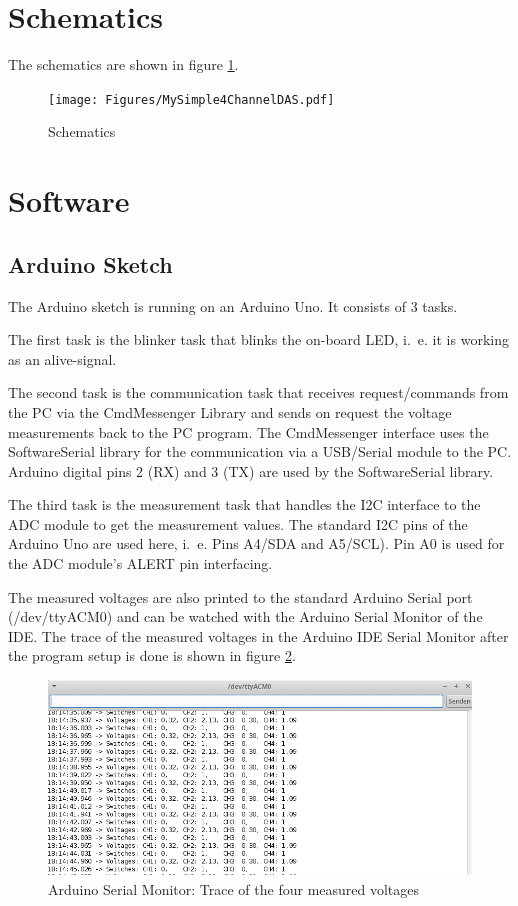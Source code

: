 \documentclass[11pt, oneside]{scrartcl}   	%
\begin{document}
\newpage
\section{Schematics}
The schematics are shown in figure \ref{fig:Schematics}.
\begin{figure}[htbp]
	\centering
	\texttt{[image: Figures/MySimple4ChannelDAS.pdf]}
	\caption[Schematics]{Schematics}
	\label{fig:Schematics}
\end{figure}

\newpage
\section{Software}
\subsection{Arduino Sketch}
The Arduino sketch is running on an Arduino Uno. It consists of 3 tasks.

The first task is the blinker task that blinks the on-board LED, i.~e. it is working as an alive-signal.

The second task is the communication task that receives request/commands from the PC via the CmdMessenger Library and sends on request the voltage measurements
back to the PC program. The CmdMessenger interface uses the SoftwareSerial library for the communication via a USB/Serial module to the PC. 
Arduino digital pins 2 (RX) and 3 (TX) are used by the SoftwareSerial library.

The third task is the measurement task that handles the I2C interface to the ADC module to get the measurement values. The standard I2C pins of the Arduino Uno are used here, i.~e. Pins A4/SDA and A5/SCL). Pin A0 is used for the ADC module's ALERT pin interfacing.

The measured voltages are also printed to the standard Arduino Serial port (/dev/ttyACM0) and can be watched with the Arduino Serial Monitor of the IDE.
The trace of the measured voltages in the Arduino IDE Serial Monitor after the program setup is done is shown in figure \ref{fig:ArduinoSerialMonitorTrace}.
\begin{figure}[htbp]
	\centering
	\includegraphics[width=0.9\linewidth]{Figures/ArduinoSerialMonitorTrace.png}
	\caption[Arduino Serial Monitor: Trace of four measured voltages]{Arduino Serial Monitor: Trace of the four measured voltages}
	\label{fig:ArduinoSerialMonitorTrace}
\end{figure}
\end{document}

